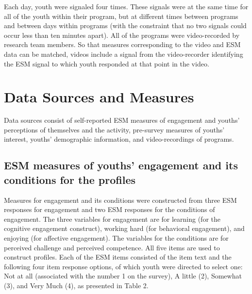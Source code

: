 \documentclass[]{book}
\theoremstyle{definition}
\theoremstyle{definition}
\theoremstyle{definition}
\theoremstyle{remark}
\begin{document}
Each day, youth were signaled four times. These signals were at the same
time for all of the youth within their program, but at different times
between programs and between days within programs (with the constraint
that no two signals could occur less than ten minutes apart). All of the
programs were video-recorded by research team members. So that measures
corresponding to the video and ESM data can be matched, videos include a
signal from the video-recorder identifying the ESM signal to which youth
responded at that point in the video.

\section{Data Sources and Measures}\label{data-sources-and-measures}

Data sources consist of self-reported ESM measures of engagement and
youths' perceptions of themselves and the activity, pre-survey measures
of youths' interest, youths' demographic information, and
video-recordings of programs.

\subsection{ESM measures of youths' engagement and its conditions for
the
profiles}\label{esm-measures-of-youths-engagement-and-its-conditions-for-the-profiles}

Measures for engagement and its conditions were constructed from three
ESM responses for engagement and two ESM responses for the conditions of
engagement. The three variables for engagement are for learning (for the
cognitive engagement construct), working hard (for behavioral
engagement), and enjoying (for affective engagement). The variables for
the conditions are for perceived challenge and perceived competence. All
five items are used to construct profiles. Each of the ESM items
consisted of the item text and the following four item response options,
of which youth were directed to select one: Not at all (associated with
the number 1 on the survey), A little (2), Somewhat (3), and Very Much
(4), as presented in Table 2.

\begin{table}

\caption{\label{tab:unnamed-chunk-4}ESM measures for profiles}
\centering
{}
\end{table}
\end{document}
